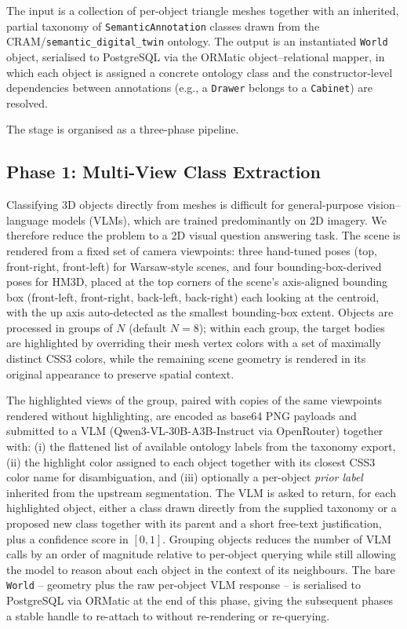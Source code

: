 \documentclass[conference]{IEEEtran}
\begin{document}
The input is a collection of per-object triangle meshes together with an
inherited, partial taxonomy of \texttt{SemanticAnnotation} classes drawn
from the CRAM/\texttt{semantic\_digital\_twin} ontology. The output is an
instantiated \texttt{World} object, serialised to PostgreSQL via the
ORMatic object--relational mapper, in which each object is assigned a
concrete ontology class and the constructor-level dependencies between
annotations (e.g., a \texttt{Drawer} belongs to a \texttt{Cabinet}) are
resolved.

The stage is organised as a three-phase pipeline.

\subsection{Phase 1: Multi-View Class Extraction}
\label{sec:extract}

Classifying 3D objects directly from meshes is difficult for
general-purpose vision--language models (VLMs), which are trained
predominantly on 2D imagery. We therefore reduce the problem to a 2D
visual question answering task. The scene is rendered from a fixed set
of camera viewpoints: three hand-tuned poses (top, front-right,
front-left) for Warsaw-style scenes, and four bounding-box-derived
poses for HM3D, placed at the top corners of the scene's axis-aligned
bounding box (front-left, front-right, back-left, back-right) each
looking at the centroid, with the up axis auto-detected as the
smallest bounding-box extent. Objects are processed in groups of $N$
(default $N{=}8$); within each group, the target bodies are highlighted
by overriding their mesh vertex colors with a set of maximally
distinct CSS3 colors, while the remaining scene geometry is rendered
in its original appearance to preserve spatial context.

The highlighted views of the group, paired with copies of the same
viewpoints rendered without highlighting, are encoded as base64 PNG
payloads and submitted to a VLM (Qwen3-VL-30B-A3B-Instruct via
OpenRouter) together with: (i) the flattened list of available
ontology labels from the taxonomy export, (ii) the highlight color
assigned to each object together with its closest CSS3 color name for
disambiguation, and (iii) optionally a per-object \emph{prior label}
inherited from the upstream segmentation. The VLM is asked to return,
for each highlighted object, either a class drawn directly from the
supplied taxonomy or a proposed new class together with its parent and
a short free-text justification, plus a confidence score in $[0, 1]$.
Grouping objects reduces the number of VLM calls by an order of
magnitude relative to per-object querying while still allowing the
model to reason about each object in the context of its neighbours.
The bare \texttt{World} -- geometry plus the raw per-object VLM
response -- is serialised to PostgreSQL via ORMatic at the end of this
phase, giving the subsequent phases a stable handle to re-attach to
without re-rendering or re-querying.
\end{document}
